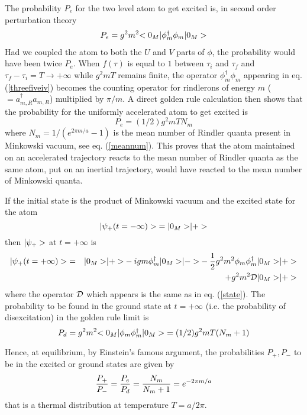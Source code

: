 The probability $P_e$ for the two level atom to get excited is, in second
order perturbation theory
  \begin{eqnarray}
P_e =
g^2 m^2 \mbox{$ \mbox{$ < 0_M \vert $} \phi_m^\dagger  \phi_m \mbox{$ \vert 0_M > $} $} \label{threefiveiv}
\end{eqnarray}
Had we coupled the atom to both the $U$ and $V$ parts of $\phi$, the
probability would have been twice $P_e$.
When $f(\tau)$ is equal to $1$ between $\tau_i$ and $\tau_f$
and $\tau_f - \tau_i = T \rightarrow +\infty$ while $g^2 m T$ remains finite,
the operator $\phi_m^\dagger  \phi_m
$ appearing in eq. (\ref{threefiveiv}) becomes the counting operator for
rindlerons of energy $m$ ($= a_{m,R}^\dagger  a_{m,R}$) multiplied by
$\pi/ m$. A direct golden rule calculation
then shows that the probability for the
uniformly accelerated atom to get excited is
\cite{Unruh} \begin{equation} P_{e} =
(1/2)
g^2 m
T N_m \label{threefivexiii}
\end{equation}
where $N_m = 1/ (e^{2 \pi m/a} -1)$ is
the mean number of Rindler quanta present in Minkowski vacuum, see
eq. (\ref{meannum}). This proves that the atom maintained on an
accelerated trajectory  reacts to
the mean number of Rindler quanta as
the same atom, put on an inertial
trajectory, would have reacted to the mean number of Minkowski quanta.


If the initial state is the product of Minkowski vacuum and the excited state
for the atom
\begin{equation}\mbox{$ \vert \psi_+(t=-\infty) > $}= \mbox{$ \vert 0_M > $}\mbox{$ \vert + > $}
\end{equation}
then $\mbox{$ \vert \psi_+ > $}$ at $t=+\infty$ is
\begin{eqnarray}
\mbox{$ \vert \psi_+(t=+\infty) > $} &=& \mbox{$ \vert 0_M > $} \mbox{$ \vert + > $}
-ig m \phi_m^\dagger \mbox{$ \vert 0_M > $}\mbox{$ \vert - > $}-  {1\over 2} g^2
m^2  \phi_m \phi_m^\dagger \mbox{$ \vert 0_M > $}\mbox{$ \vert + > $}
\nonumber\\
& &+  g^2 m^2
{\cal D}  \mbox{$ \vert 0_M > $}\mbox{$ \vert + > $}
\label{state+}
\end{eqnarray}
where the operator ${\cal D}$ which appears is the same as
in eq. (\ref{state}).
The probability to be found in the ground state at $t=+\infty$ (i.e.
the probability of disexcitation) in the golden
rule limit is
\begin{equation} P_{d} = g^2 m^2 \mbox{$ \mbox{$ < 0_M \vert $} \phi_m \phi_m^\dagger \mbox{$ \vert 0_M > $} $}
= (1/2) g^2 m
T ( N_m + 1) \label{threefivexiiid}
\end{equation}

Hence, at equilibrium, by Einstein's famous argument,
 the probabilities $P_+, P_-$ to be in the excited or
ground states are given by
\begin{equation}
{P_+ \over P_-}={P_e\over P_d}={N_m\over N_m + 1} = e^{-2 \pi m / a}
\label{P/P}
\end{equation}
that is a thermal distribution at temperature $T= a/ 2\pi$.

